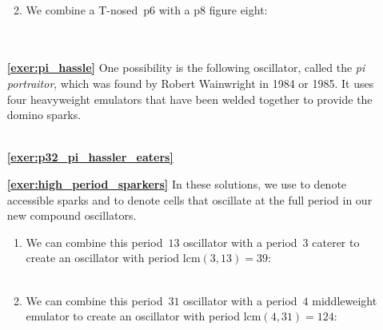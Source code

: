 \begin{multicols}{2}
\begin{itemize}[leftmargin=0em]
\begin{enumerate}[leftmargin=1.5em,label=\bf\color{ocre}(\alph*)]
		 \\
		
		\item We combine a T-nosed~p$6$ with a p$8$ figure eight: \\[-0.6em]
		
		 \\[-0.8em]
		
		 \\
	\end{enumerate}


	\item[\bf\color{ocre}\sffamily\ref{exer:pi_hassle}] One possibility is the following oscillator, called the \emph{pi portraitor}, which was found by Robert Wainwright in 1984 or 1985. It uses four heavyweight emulators that have been welded together to provide the domino sparks. \\[-0.6em]
	
	 \\
	
	
	\item[\bf\color{ocre}\sffamily\ref{exer:p32_pi_hassler_eaters}]  \\


	\item[\bf\color{ocre}\sffamily\ref{exer:high_period_sparkers}] In these solutions, we use  to denote accessible sparks and  to denote cells that oscillate at the full period in our new compound oscillators.
	\begin{enumerate}[leftmargin=1.5em,label=\bf\color{ocre}(\alph*)]
		\item We can combine this period~$13$ oscillator with a period~$3$ caterer to create an oscillator with period $\mathrm{lcm}(3,13) = 39$: \\[-0.6em]
		
		 \\

		\item We can combine this period~$31$ oscillator with a period~$4$ middleweight emulator to create an oscillator with period $\mathrm{lcm}(4,31) = 124$:  \\[-0.6em]
		

\end{enumerate}
\end{itemize}
\end{multicols}
